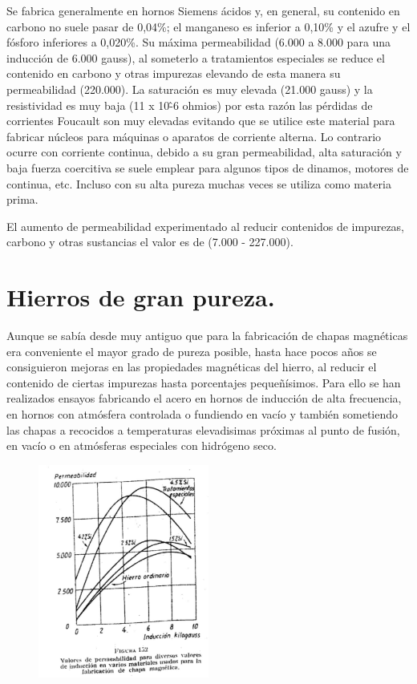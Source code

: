 \documentclass[12pt,a4paper]{article}
\begin{document}
Se fabrica generalmente en hornos Siemens ácidos y, en general, su contenido en carbono no suele pasar de 0,04\%; el manganeso es inferior a 0,10\% y el azufre y el fósforo inferiores a 0,020\%. Su máxima permeabilidad (6.000 a 8.000 para una inducción de 6.000 gauss), al someterlo a tratamientos especiales se reduce el contenido en carbono y otras impurezas elevando de esta manera su permeabilidad (220.000). La saturación es muy elevada (21.000 gauss) y la resistividad es muy baja (11 x 10\^-6 ohmios) por esta razón las pérdidas de corrientes Foucault son muy elevadas evitando que se utilice este material para fabricar núcleos para máquinas o aparatos de corriente alterna. Lo contrario ocurre con corriente continua, debido a su gran permeabilidad, alta saturación y baja fuerza coercitiva se suele emplear para algunos tipos de dinamos, motores de continua, etc. Incluso con su alta pureza muchas veces se utiliza como materia prima.

El aumento de permeabilidad experimentado al reducir contenidos de impurezas, carbono y otras sustancias el valor es de (7.000 - 227.000).

\section{Hierros de gran pureza.}

Aunque se sabía desde muy antiguo que para la fabricación de chapas magnéticas era conveniente el mayor grado de pureza posible, hasta hace pocos años se consiguieron mejoras en las propiedades magnéticas del hierro, al reducir el contenido de ciertas impurezas hasta porcentajes pequeñísimos. Para ello se han realizados ensayos fabricando el acero en hornos de inducción de alta frecuencia, en hornos con atmósfera controlada o fundiendo en vacío y también sometiendo las chapas a recocidos a temperaturas elevadisimas próximas al punto de fusión, en vacío o en atmósferas especiales con hidrógeno seco. 

 \begin{figure}[H]    
    \centering         
    \includegraphics[width=0.5\textwidth]{IMAGENES LATEX/4.jpg}
\end{figure}
\end{document}
